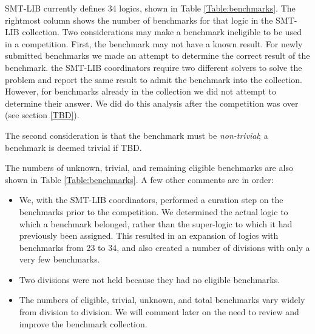 \documentclass[twosize,11pt]{article}
\begin{document}
SMT-LIB currently defines 34 logics, shown in Table \ref{Table:benchmarks}. The rightmost column shows the number of benchmarks for that logic in the SMT-LIB collection. Two considerations may make a benchmark ineligible to be used in a competition. First, the benchmark may not have a known result. For newly submitted benchmarks
we made an attempt to determine the correct result of the benchmark. the SMT-LIB coordinators require two 
different solvers to solve the problem and report the same result to admit the benchmark into the collection.
However, for benchmarks already in the collection we did not attempt to determine their answer. We did do this analysis after the competition was over (see section \ref{TBD}).

The second consideration is that the benchmark must be \textit{non-trivial}; a benchmark is deemed trivial if TBD.

The numbers of unknown, trivial, and remaining eligible benchmarks are also shown in Table \ref{Table:benchmarks}. A few other comments are in order:
\begin{itemize}
\item We, with the SMT-LIB coordinators, performed a curation step on the benchmarks prior to the competition. We determined the actual logic to which a benchmark belonged, rather than the super-logic
to which it had previously been assigned. This resulted in an expansion of logics with benchmarks from 23 to 34, and also created a number of divisions with only a very few benchmarks.
\item Two divisions were not held because they had no eligible benchmarks.
\item The numbers of eligible, trivial, unknown, and total benchmarks vary widely from division to division. We will comment later on the need to review and improve the benchmark collection.
\end{itemize}
\end{document}
